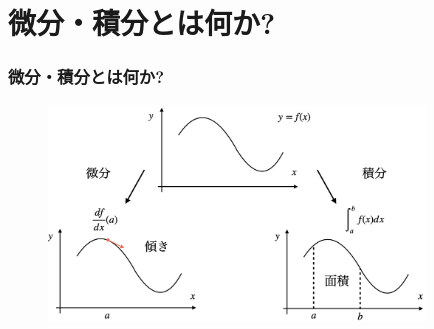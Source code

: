 %
%
%
%
%
%
%







\section{微分・積分とは何か?}


\begin{frame}
\frametitle{微分・積分とは何か?}


 \begin{figure}[htbp]
 \begin{center} 
  \includegraphics[width=100mm]{calculus1/diff_int.png}
 \end{center}
\end{figure}

\end{frame}


